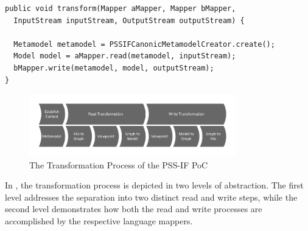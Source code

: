 \begin{verbatim}
public void transform(Mapper aMapper, Mapper bMapper,
  InputStream inputStream, OutputStream outputStream) {
  
  Metamodel metamodel = PSSIFCanonicMetamodelCreator.create();
  Model model = aMapper.read(metamodel, inputStream);
  bMapper.write(metamodel, model, outputStream);
}
\end{verbatim}

\begin{figure}[h]
\centering
\includegraphics[width=0.8\textwidth]{figures/process.pdf}
\caption{The Transformation Process of the PSS-IF PoC}
\label{fig:transformationprocess}
\end{figure}

In , the transformation process is depicted in two levels of abstraction. The first level addresses the separation into two distinct read and write steps, while the second level demonstrates how both the read and write processes are accomplished by the respective language mappers.
